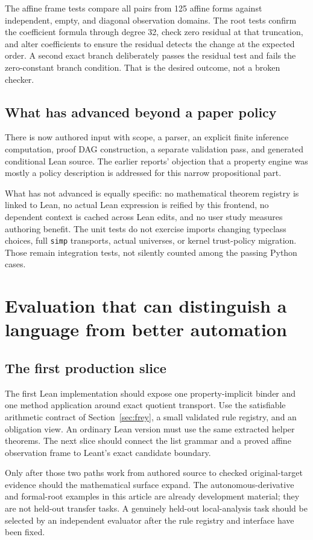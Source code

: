 \documentclass[11pt,a4paper]{article}
\newcommand{\code}[1]{\nolinkurl{#1}}
\theoremstyle{plain}
\theoremstyle{definition}
\theoremstyle{remark}
\begin{document}
The affine frame tests compare all pairs from 125 affine forms against independent, empty, and diagonal observation domains. The root tests confirm the coefficient formula through degree 32, check zero residual at that truncation, and alter coefficients to ensure the residual detects the change at the expected order. A second exact branch deliberately passes the residual test and fails the zero-constant branch condition. That is the desired outcome, not a broken checker.

\subsection{What has advanced beyond a paper policy}
There is now authored input with scope, a parser, an explicit finite inference computation, proof DAG construction, a separate validation pass, and generated conditional Lean source. The earlier reports' objection that a property engine was mostly a policy description is addressed for this narrow propositional part.

What has not advanced is equally specific: no mathematical theorem registry is linked to Lean, no actual Lean expression is reified by this frontend, no dependent context is cached across Lean edits, and no user study measures authoring benefit. The unit tests do not exercise imports changing typeclass choices, full \code{simp} transports, actual universes, or kernel trust-policy migration. Those remain integration tests, not silently counted among the passing Python cases.

\section{Evaluation that can distinguish a language from better automation}\label{sec:evaluation}

\subsection{The first production slice}
The first Lean implementation should expose one property-implicit binder and one method application around exact quotient transport. Use the satisfiable arithmetic contract of Section~\ref{sec:frey}, a small validated rule registry, and an obligation view. An ordinary Lean version must use the same extracted helper theorems. The next slice should connect the list grammar and a proved affine observation frame to Leant's exact candidate boundary.

Only after those two paths work from authored source to checked original-target evidence should the mathematical surface expand. The autonomous-derivative and formal-root examples in this article are already development material; they are not held-out transfer tasks. A genuinely held-out local-analysis task should be selected by an independent evaluator after the rule registry and interface have been fixed.
\end{document}
